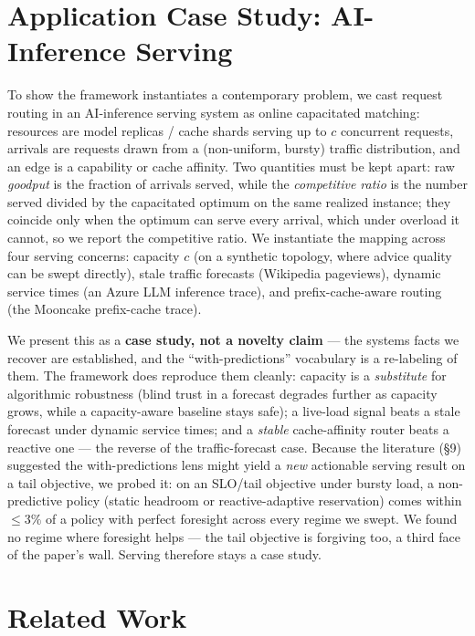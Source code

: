 \section{Application Case Study: AI-Inference
Serving}

To show the framework instantiates a contemporary problem, we cast
request routing in an AI-inference serving system as online capacitated
matching: resources are model replicas / cache shards serving up to
\(c\) concurrent requests, arrivals are requests drawn from a
(non-uniform, bursty) traffic distribution, and an edge is a capability
or cache affinity. Two quantities must be kept apart: raw \emph{goodput}
is the fraction of arrivals served, while the \emph{competitive ratio}
is the number served divided by the capacitated optimum on the same
realized instance; they coincide only when the optimum can serve every
arrival, which under overload it cannot, so we report the competitive
ratio. We instantiate the mapping across four serving concerns: capacity
\(c\) (on a synthetic topology, where advice quality can be swept
directly), stale traffic forecasts (Wikipedia pageviews), dynamic
service times (an Azure LLM inference trace), and prefix-cache-aware
routing (the Mooncake prefix-cache trace).

We present this as a \textbf{case study, not a novelty claim} --- the
systems facts we recover are established, and the ``with-predictions''
vocabulary is a re-labeling of them. The framework does reproduce them
cleanly: capacity is a \emph{substitute} for algorithmic robustness
(blind trust in a forecast degrades further as capacity grows, while a
capacity-aware baseline stays safe); a live-load signal beats a stale
forecast under dynamic service times; and a \emph{stable} cache-affinity
router beats a reactive one --- the reverse of the traffic-forecast
case. Because the literature (§9) suggested the with-predictions lens
might yield a \emph{new} actionable serving result on a tail objective,
we probed it: on an SLO/tail objective under bursty load, a
non-predictive policy (static headroom or reactive-adaptive reservation)
comes within \(\le 3\%\) of a policy with perfect foresight across every
regime we swept. We found no regime where foresight helps --- the tail
objective is forgiving too, a third face of the paper's wall. Serving
therefore stays a case study.

\section{Related Work}

